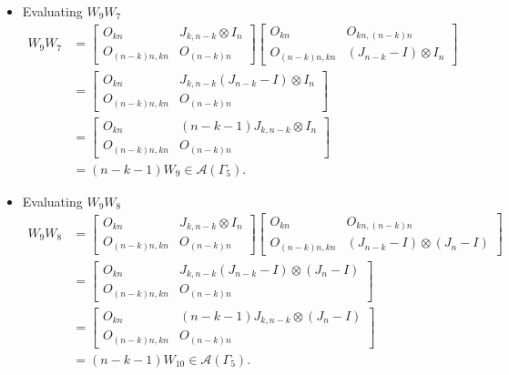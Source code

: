 \begin{itemize}
\item Evaluating $W_{9}W_{7}$
\begin{align*}
    W_9W_7
    &= \begin{bmatrix}
        O_{kn} & J_{k,n-k} \otimes I_n \\
        O_{(n-k)n,kn} & O_{(n-k)n}
    \end{bmatrix}\begin{bmatrix}
        O_{kn} & O_{kn, (n-k)n} \\
        O_{(n-k)n,kn} & (J_{n-k}-I)\otimes I_n
    \end{bmatrix}\\
    &= \begin{bmatrix}
        O_{kn} & J_{k,n-k}(J_{n-k}-I) \otimes I_n \\
        O_{(n-k)n,kn} & O_{(n-k)n}
    \end{bmatrix}\\
    &= \begin{bmatrix}
        O_{kn} & (n-k-1)J_{k,n-k} \otimes I_n \\
        O_{(n-k)n,kn} & O_{(n-k)n}
    \end{bmatrix}\\
    &= (n-k-1)W_{9}\in\mathcal{A}(\Gamma_5).
\end{align*}

\item Evaluating $W_{9}W_{8}$
\begin{align*}
    W_9W_8
    &= \begin{bmatrix}
        O_{kn} & J_{k,n-k} \otimes I_n \\
        O_{(n-k)n,kn} & O_{(n-k)n}
    \end{bmatrix}\begin{bmatrix}
        O_{kn} & O_{kn, (n-k)n} \\
        O_{(n-k)n,kn} & (J_{n-k}-I)\otimes (J_n-I)
    \end{bmatrix}\\
    &= \begin{bmatrix}
        O_{kn} & J_{k,n-k}(J_{n-k}-I) \otimes (J_n-I) \\
        O_{(n-k)n,kn} & O_{(n-k)n}
    \end{bmatrix}\\
    &= \begin{bmatrix}
        O_{kn} & (n-k-1)J_{k,n-k} \otimes (J_n-I) \\
        O_{(n-k)n,kn} & O_{(n-k)n}
    \end{bmatrix}\\
    &= (n-k-1)W_{10}\in\mathcal{A}(\Gamma_5).
\end{align*}


\end{itemize}
